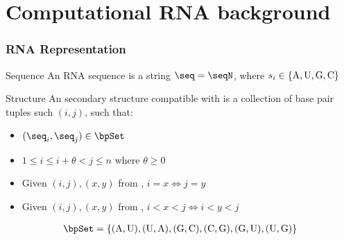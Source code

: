 \documentclass{beamer}
\begin{document}
\section{Computational RNA background}

\begin{frame}
  \frametitle{RNA Representation}
  \begin{block}{Sequence}
  An RNA sequence is a string $\seq = \seqN$, where $s_i \in \{\text{A,\,U,\,G,\,C}\}$
  \end{block}
  \begin{block}{Structure}
  An secondary structure \str compatible with \seq is a collection of base pair tuples such $(i,j)$, such that:
  \begin{itemize}
  \item $(\seq_i, \seq_j) \in \bpSet$
  \item $1 \le i \le i+\theta < j \le n$ where $\theta \ge 0$
  \item Given $(i,j), (x,y)$ from \str, $i=x \iff j=y$
  \item Given $(i,j), (x,y)$ from \str, $i<x<j \iff i<y<j$
  \end{itemize}
  \end{block}

  \begin{align*}
    \bpSet =
  \{\text{(A,\,U),\,(U,\,A),\,(G,\,C),\,(C,\,G),\,(G,\,U),\,(U,\,G)}\}
  \end{align*}
\end{frame}
\end{document}
